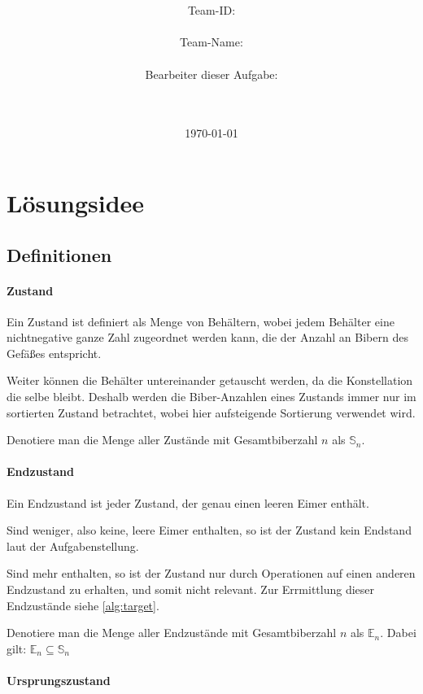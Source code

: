 \documentclass[a4paper,10pt,ngerman]{scrartcl}
\title{\textbf{\Huge\Aufgabe}}
\author{\LARGE Team-ID: \LARGE \TeamID \\\\
	    \LARGE Team-Name: \LARGE \TeamName \\\\
	    \LARGE Bearbeiter dieser Aufgabe: \\ 
	    \LARGE \Namen\\\\}
\date{\LARGE\today}
\begin{document}
\maketitle
\tableofcontents

\vspace{0.5cm}

\section{Lösungsidee}

\subsection{Definitionen}

\paragraph{Zustand} \label{def:state}

Ein Zustand ist definiert als Menge von Behältern, wobei jedem Behälter eine nichtnegative ganze Zahl zugeordnet werden kann, die der Anzahl an Bibern des Gefäßes entspricht.

Weiter können die Behälter untereinander getauscht werden, da die Konstellation die selbe bleibt. Deshalb werden die Biber-Anzahlen eines Zustands immer nur im sortierten Zustand betrachtet, wobei hier aufsteigende Sortierung verwendet wird.

Denotiere man die Menge aller Zustände mit Gesamtbiberzahl \(n\) als \(\mathbb{S}_n\).

\paragraph{Endzustand} \label{def:target}

Ein Endzustand ist jeder Zustand, der genau einen leeren Eimer enthält.

Sind weniger, also keine, leere Eimer enthalten, so ist der Zustand kein Endstand laut der Aufgabenstellung.

Sind mehr enthalten, so ist der Zustand nur durch Operationen auf einen anderen Endzustand zu erhalten, und somit nicht relevant. Zur Errmittlung dieser Endzustände siehe \cref{alg:target}.

Denotiere man die Menge aller Endzustände mit Gesamtbiberzahl \(n\) als \(\mathbb{E}_n\).
Dabei gilt: \(\mathbb{E}_n\subseteq\mathbb{S}_n\)

\paragraph{Ursprungszustand} \label{def:origin}
\end{document}
